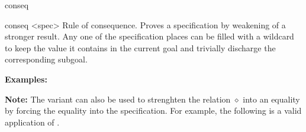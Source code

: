 \begin{tactic}{conseq}
  \begin{tsyntax}{conseq <spec>}
  Rule of consequence. Proves a specification by weakening of a
  stronger result. Any one of the specification places can be filled
  with a wildcard \tct{_} to keep the value it contains in the current
  goal and trivially discharge the corresponding subgoal.

  \textbf{Examples:}

  \textbf{Note:} The \phl variant can also be used to strenghten the
  relation $\diamond$ into an equality by forcing the equality into
  the specification. For example, the following is a valid application
  of .
  \end{tsyntax}


\end{tactic}

